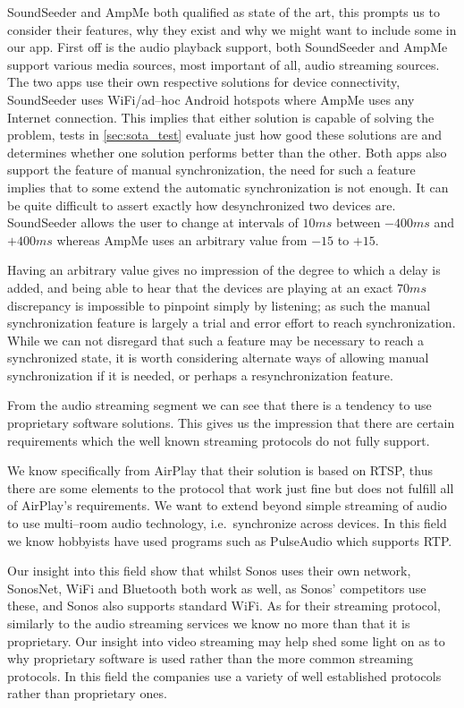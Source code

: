 SoundSeeder and AmpMe both qualified as state of the art, this prompts us to consider their features, why they exist and why we might want to include some in our app.
First off is the audio playback support, both SoundSeeder and AmpMe support various media sources, most important of all, audio streaming sources.
The two apps use their own respective solutions for device connectivity, SoundSeeder uses WiFi/ad--hoc Android hotspots where AmpMe uses any Internet connection.
This implies that either solution is capable of solving the problem, tests in \cref{sec:sota_test} evaluate just how good these solutions are and determines whether one solution performs better than the other.
Both apps also support the feature of manual synchronization, the need for such a feature implies that to some extend the automatic synchronization is not enough.
It can be quite difficult to assert exactly how desynchronized two devices are.
SoundSeeder allows the user to change at intervals of $10 ms$ between $-400 ms$ and $+400 ms$ whereas AmpMe uses an arbitrary value from $-15$ to $+15$.

Having an arbitrary value gives no impression of the degree to which a delay is added, and being able to hear that the devices are playing at an exact $70ms$ discrepancy is impossible to pinpoint simply by listening; as such the manual synchronization feature is largely a trial and error effort to reach synchronization.
While we can not disregard that such a feature may be necessary to reach a synchronized state, it is worth considering alternate ways of allowing manual synchronization if it is needed, or perhaps a resynchronization feature.

\bigskip
From the audio streaming segment we can see that there is a tendency to use proprietary software solutions.
This gives us the impression that there are certain requirements which the well known streaming protocols do not fully support.

We know specifically from AirPlay that their solution is based on \ac{RTSP}, thus there are some elements to the protocol that work just fine but does not fulfill all of AirPlay's requirements.
We want to extend beyond simple streaming of audio to use multi--room audio technology, i.e.~synchronize across devices.
In this field we know hobbyists have used programs such as PulseAudio which supports \ac{RTP}.

Our insight into this field show that whilst Sonos uses their own network, SonosNet, WiFi and Bluetooth both work as well, as Sonos' competitors use these, and Sonos also supports standard WiFi.
As for their streaming protocol, similarly to the audio streaming services we know no more than that it is proprietary.
Our insight into video streaming may help shed some light on as to why proprietary software is used rather than the more common streaming protocols.
In this field the companies use a variety of well established protocols rather than proprietary ones.

